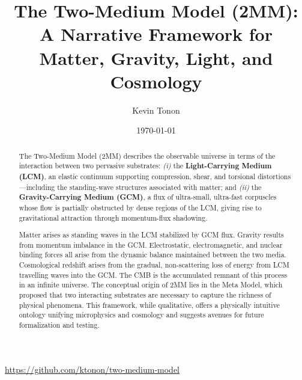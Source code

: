 
\usepackage[style=numeric, sorting=none]{biblatex}


\title{The Two-Medium Model (2MM):\\
A Narrative Framework for Matter, Gravity, Light, and Cosmology}

\author{Kevin Tonon}
\date{\today}


\maketitle
\begin{center}
  \url{https://github.com/ktonon/two-medium-model}
\end{center}

\begin{abstract}
The Two-Medium Model (2MM) describes the observable universe in terms of the interaction between two pervasive substrates: \textit{(i)} the \textbf{Light-Carrying Medium (LCM)}, an elastic continuum supporting compression, shear, and torsional distortions—including the standing-wave structures associated with matter; and \textit{(ii)} the \textbf{Gravity-Carrying Medium (GCM)}, a flux of ultra-small, ultra-fast corpuscles whose flow is partially obstructed by dense regions of the LCM, giving rise to gravitational attraction through momentum-flux shadowing.

Matter arises as standing waves in the LCM stabilized by GCM flux.
Gravity results from momentum imbalance in the GCM. Electrostatic,
electromagnetic, and nuclear binding forces all arise from the dynamic
balance maintained between the two media. Cosmological
redshift arises from the gradual, non-scattering loss of energy
from LCM travelling waves into the GCM. The CMB is the accumulated
remnant of this process in an infinite universe. The conceptual origin of 2MM
lies in the Meta Model, which proposed that two interacting substrates
are necessary to capture the richness of physical phenomena. This
framework, while qualitative, offers a physically intuitive ontology
unifying microphysics and cosmology and suggests avenues for future
formalization and testing.
\end{abstract}

{
\setcounter{tocdepth}{3}
\tableofcontents
}



\printbibliography


